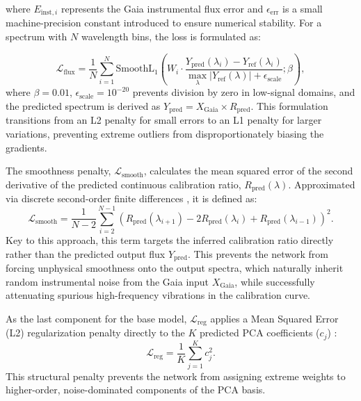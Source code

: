 \documentclass{aa}
\begin{document}
where $E_{\text{inst}, i}$ represents the Gaia instrumental flux error \citep{gaia_dr3_2023} and $\epsilon_{\text{err}}$ is a small machine-precision constant introduced to ensure numerical stability. For a spectrum with $N$ wavelength bins, the loss is formulated as:

\begin{equation}
    \mathcal{L}_{\text{flux}} = \frac{1}{N} \sum_{i=1}^{N} \text{SmoothL}_1\left( W_i \cdot \frac{Y_{\text{pred}}(\lambda_i) - Y_{\text{ref}}(\lambda_i)}{\max_{\lambda} |Y_{\text{ref}}(\lambda)| + \epsilon_{\text{scale}}}; \beta \right),
\end{equation}
where $\beta = 0.01$, $\epsilon_{\text{scale}} = 10^{-20}$ prevents division by zero in low-signal domains, and the predicted spectrum is derived as $Y_{\text{pred}} = X_{\text{Gaia}} \times R_{\text{pred}}$. This formulation transitions from an L2 penalty for small errors to an L1 penalty for larger variations, preventing extreme outliers from disproportionately biasing the gradients.

The smoothness penalty, $\mathcal{L}_{\text{smooth}}$, calculates the mean squared error of the second derivative of the predicted continuous calibration ratio, $R_{\text{pred}}(\lambda)$. Approximated via discrete second-order finite differences \citep{eilers1996}, it is defined as:
\begin{equation}
    \mathcal{L}_{\text{smooth}} = \frac{1}{N-2} \sum_{i=2}^{N-1} \left( R_{\text{pred}}(\lambda_{i+1}) - 2R_{\text{pred}}(\lambda_i) + R_{\text{pred}}(\lambda_{i-1}) \right)^2.
\end{equation}
Key to this approach, this term targets the inferred calibration ratio directly rather than the predicted output flux $Y_{\text{pred}}$. This prevents the network from forcing unphysical smoothness onto the output spectra, which naturally inherit random instrumental noise from the Gaia input $X_{\text{Gaia}}$, while successfully attenuating spurious high-frequency vibrations in the calibration curve.

As the last component for the base model, $\mathcal{L}_{\text{reg}}$ applies a Mean Squared Error (L2) regularization penalty directly to the $K$ predicted PCA coefficients ($c_j$) \citep{BailerJones1998}:
\begin{equation}
    \mathcal{L}_{\text{reg}} = \frac{1}{K} \sum_{j=1}^{K} c_j^2.
\end{equation}
This structural penalty prevents the network from assigning extreme weights to higher-order, noise-dominated components of the PCA basis.
\end{document}
